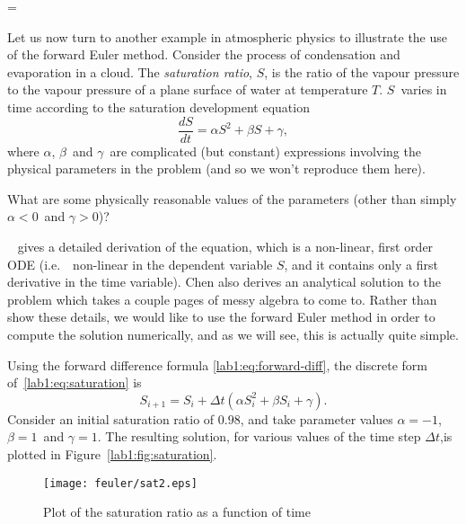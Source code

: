 \documentclass{article}
\makeatletter
\let\realnormalsize=\normalsize
\def\liih@math{\ifmmode$\else\bad@math\fi}
\def\adjustnormalsize{\def\normalsize{\mathsurround=0pt \realnormalsize
 \parindent=0pt\abovedisplayskip=0pt\belowdisplayskip=0pt}%
 \def\phantompar{\csname par\endcsname}\normalsize}%
\newcommand\lthtmlvboxmathA{\adjustnormalsize\setbox\sizebox=\vbox\bgroup %
 \let\ifinner=\iffalse \let\)\liih@math }%
\newcommand\lthtmlmathtype[1]{\gdef\lthtmlmathenv{#1}}%
\newcommand\lthtmlfigureA[1]{\let\@savefreelist\@freelist
       \lthtmlmathtype{#1}\lthtmlvboxmathA}%
\makeatother
\begin{document}
{\newpage\clearpage
\lthtmlfigureA{example803}%
\begin{example}

  Let us now turn to another example in atmospheric physics to
  illustrate the use of the forward Euler method. 
  Consider the process of condensation and evaporation in a cloud. 
  The \emph{saturation ratio}, $S$, is the ratio of the vapour pressure
  to the vapour pressure of a plane surface of water at temperature
  $T$.  $S$\  varies in time according to the saturation development
  equation 
  \begin{equation}
    \frac{dS}{dt} = \alpha S^2 + \beta S + \gamma,
  \end{equation}
  where $\alpha$, $\beta$\  and $\gamma$\  are complicated (but constant)
  expressions involving the physical parameters in the problem (and so
  we won't reproduce them here).  
\par\begin{note}
    What are some physically reasonable values of the
    parameters (other than simply $\alpha<0$\  and $\gamma>0$)?   
  \end{note}
\par ~\cite{chen} gives a detailed derivation of the equation, which
  is a non-linear, first order ODE (i.e.~~non-linear in the dependent
  variable $S$, and it contains only a
  first derivative in the time variable). 
  Chen also derives an analytical solution to the problem which takes
  a couple pages of messy algebra to come to.
  Rather than show these
  details, we would like to use the forward Euler method in order to
  compute the solution numerically, and as we will see, this is
  actually quite simple.
\par Using the forward difference formula \eqref{lab1:eq:forward-diff}, the
  discrete form of~\eqref{lab1:eq:saturation} is 
  \begin{displaymath}
  S_{i+1} = S_i + \Delta t \left( \alpha S_i^2 + \beta S_i +
    \gamma \right).
  \end{displaymath}
  Consider an initial saturation ratio of $0.98$, and take parameter
  values $\alpha=-1$, $\beta=1$\  and $\gamma=1$.  
The resulting solution, for various values of the time step \mbox{$\Delta t$}{},is
  plotted in Figure~\ref{lab1:fig:saturation}. 
  \begin{figure}[htbp]
    \begin{center}
      \leavevmode
\texttt{[image: feuler/sat2.eps]}      
      \caption{Plot of the saturation ratio as a function of time
}
\end{center}
\end{figure}
\end{example}}
\end{document}
